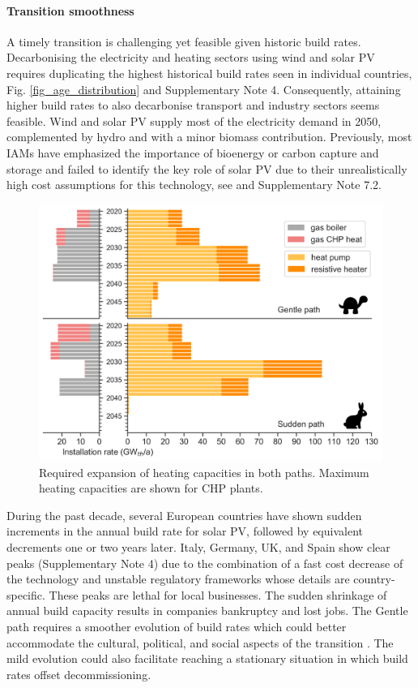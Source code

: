 \documentclass[5p]{elsarticle} %
\begin{document}
\paragraph{\textbf{Transition smoothness}} A timely transition is challenging yet feasible given historic build rates. Decarbonising the electricity and heating sectors using wind and solar PV requires 
duplicating the highest historical build rates seen in individual countries, Fig. \ref{fig_age_distribution} and Supplementary Note 4. Consequently, attaining higher build rates to also decarbonise transport and industry sectors seems feasible. Wind and solar PV supply most of the electricity demand in 2050, complemented by hydro and with a minor biomass contribution. Previously, most IAMs have emphasized the importance of bioenergy or carbon capture and storage and failed to identify the key role of solar PV due to their unrealistically high cost assumptions for this technology, see \cite{Creutzig_2017, Krey_2019} and Supplementary Note 7.2. \\

\begin{figure}[!h]
\centering
\includegraphics[width=\columnwidth]{figures/heating_expansion_Base.png}
\caption{Required expansion of heating capacities in both paths. Maximum heating capacities are shown for CHP plants.} \label{fig_heating_expansion} 
\end{figure}

During the past decade, several European countries have shown sudden increments in the annual build rate for solar PV, followed by equivalent decrements one or two years later. Italy, Germany, UK, and Spain show clear peaks (Supplementary Note 4)  due to the combination of a fast cost decrease of the technology and unstable regulatory frameworks whose details are country-specific. These peaks are lethal for local businesses. The sudden shrinkage of annual build capacity results in companies bankruptcy and lost jobs. The Gentle path requires a smoother evolution of build rates which could better accommodate the cultural, political, and social aspects of the transition \cite{Geels_2017}. The mild evolution could also facilitate reaching a stationary situation in which build rates offset decommissioning. \\ 
\end{document}
